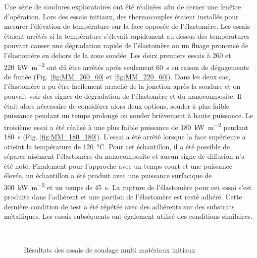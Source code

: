Une série de soudures exploratoires ont été réalisées afin de cerner une fenêtre d'opération. 
Lors des essais initiaux, des thermocouples étaient installés pour mesurer l'élévation de température sur la face opposée de l'élastomère. 
Les essais étaient arrêtés si la température s'élevait rapidement au-dessus des températures pouvant causer une dégradation rapide de l'élastomère ou un fluage prononcé de l'élastomère en dehors de la zone soudée. 
Les deux premiers essais à 260 et \SI{220}{\kilo\watt\per\square\metre} ont dû être arrêtés après seulement \SI{60}{\second} en raison de dégagements de fumée (Fig. \ref{fig:MM_260_60} et \ref{fig:MM_220_60}). 
Dans les deux cas, l'élastomère a pu être facilement arraché de la jonction après la soudure et on pouvait voir des signes de dégradation de l'élastomère et du nanocomposite. 
Il était alors nécessaire de considérer alors deux options, souder à plus faible puissance pendant un temps prolongé ou souder brièvement à haute puissance. 
Le troisième essai a été réalisé à une plus faible puissance de \SI{180}{\kilo\watt\per\square\metre} pendant \SI{180}{\second} (Fig. \ref{fig:MM_180_180}). 
L'essai a été arrêté lorsque la face supérieure a atteint la température de \SI{120}{\celsius}. 
Pour cet échantillon, il a été possible de séparer aisément l'élastomère du nanocomposite et aucun signe de diffusion n'a été noté. 
Finalement pour l'approche avec un temps court et une puissance élevée, un échantillon a été produit avec une puissance surfacique de \SI{300}{\kilo\watt\per\square\metre} et un temps de \SI{45}{\second}. 
La rupture de l'élastomère pour cet essai s'est produite dans l'adhérent et une portion de l'élastomère est resté adhéré. 
Cette dernière condition de test a été répétée avec des adhérents sur des substrats métalliques. 
Les essais subséquents ont également utilisé des conditions similaires. 

\begin{figure}[h]
	\centering
	 \qquad
	 \\
	
	 \qquad
	\caption{Résultats des essais de soudage multi matériaux initiaux}
	\label{fig:MM_essais_initiaux}
\end{figure}

